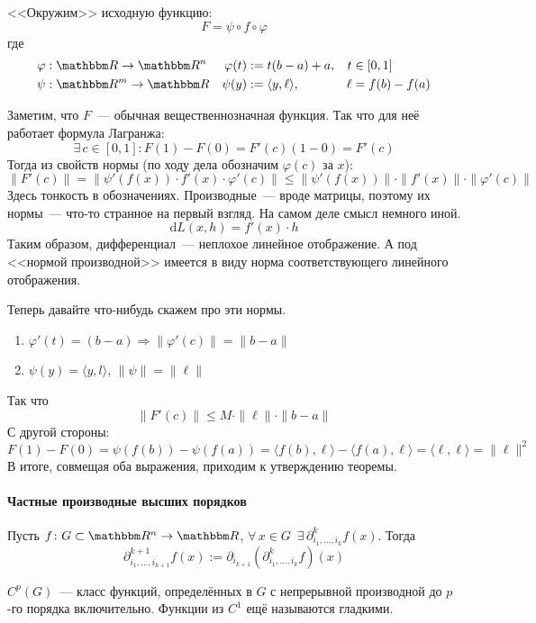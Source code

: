 \documentclass[12pt,timbord]{../../../notes}
\begin{document}
\begin{ittproof}
  <<Окружим>>  исходную функцию:
  \[
    F = \psi \circ f \circ \varphi
  \]
  где 
  \begin{align*}
    \varphi&: \R \to \R^n & \varphi(t) &:= t(b-a) + a, & t&\in [0,1] \\
    \psi&: \R^m \to \R & \psi(y) &:= \langle y, \ell \rangle, & \ell &= f(b)-f(a) 
  \end{align*}
  
  Заметим, что $F$~--- обычная вещественнозначная функция. Так что для неё работает формула
  Лагранжа:
  \[
    \exists\, c \in [0,1] \colon F(1)-F(0) = F'(c)(1-0) = F'(c)
  \]
  Тогда из свойств нормы (по ходу дела обозначим $\varphi(c)$ за $x$):
  \[
    \|F'(c)\| = \|\psi'(f(x)) \cdot f'(x) \cdot \varphi'(c)\| \leqslant 
    \|\psi'(f(x)) \| \cdot \| f'(x) \| \cdot \| \varphi'(c)\|
  \]
  Здесь тонкость в обозначениях. Производные~--- вроде матрицы, поэтому их нормы~--- что-то
  странное на первый взгляд. На самом деле смысл немного иной. 
  \[
    \mathrm d L(x, h) = f'(x) \cdot h
  \]
  Таким образом, дифференциал~--- неплохое линейное отображение. А под <<нормой производной>>
  имеется в виду норма соответствующего линейного отображения.

  Теперь давайте что-нибудь скажем про эти нормы. 

  \begin{enumerate}
    \item $\varphi'(t) = (b-a) \Rightarrow \| \varphi'(c) \| = \| b - a\|$
    \item $\psi(y) = \langle y, l \rangle$, $\| \psi\| = \|\ell\|$      
  \end{enumerate}
  Так что 
  \[
    \| F'(c)\| \leqslant M \cdot \| \ell \| \cdot \|b-a\|
  \]
  С другой стороны:
  \[
    F(1) - F(0) = \psi(f(b)) - \psi(f(a)) = \langle f(b), \ell \rangle - \langle f(a), \ell \rangle
    = \langle \ell, \ell \rangle  = \|\ell \|^2
  \]
  В итоге, совмещая оба выражения, приходим к утверждению теоремы.
\end{ittproof}

\paragraph{Частные производные высших порядков}
\label{par:diffspace::highpartial}

\begin{defn}\label{defn:diffspace::highpartial}
  Пусть $f \colon G \subset \R^n \to \R$, $\forall\, x\in G \;\: 
  \exists\, \partial^k_{i_1, \dotsc, i_{k}} f(x)$. Тогда
  \[
    \partial_{i_1, \dotsc, i_{k+1}}^{k+1} f(x) := \partial_{i_{k+1}}(\partial^k_{i_1, \dotsc, i_{k}} f) (x)
  \]
\end{defn}
\begin{rem}\label{rem:diffspace::highpartial::smooth}
  $C^p(G)$~--- класс функций, определённых в $G$ с непрерывной производной до $p$-го порядка
  включительно.
  Функции из $C^1$ ещё называются гладкими.
\end{rem}
  
\end{document}
